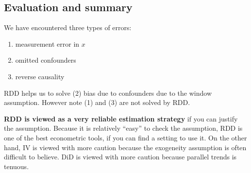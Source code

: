 		\subsection{Evaluation and summary}
			We have encountered three types of errors:
			\begin{enumerate}[(1)]
				\item measurement error in $x$
				\item omitted confounders
				\item reverse causality
			\end{enumerate}
			RDD helps us to solve (2) bias due to confounders due to the window assumption. However note (1) and (3) are not solved by RDD.
			
			\textbf{RDD is viewed as a very reliable estimation strategy} if you can justify the assumption. Because it is relatively “easy” to check the assumption, RDD is one of the best econometric tools, if you can find a setting to use it. On the other hand, IV is viewed with more caution because the exogeneity assumption is often difficult to believe. DiD is viewed with more caution because parallel trends is tenuous.

